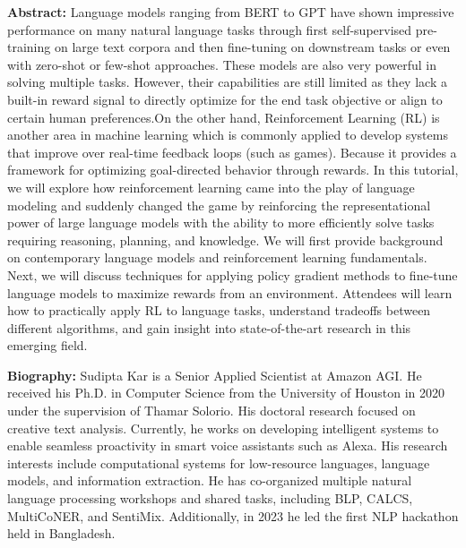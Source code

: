 {\bfseries Abstract:}
Language models ranging from BERT to GPT have shown impressive performance on many natural language tasks through first self-supervised pre-training on large text corpora and then fine-tuning on downstream tasks or even with zero-shot or few-shot approaches. These models are also very powerful in solving multiple tasks. However, their capabilities are still limited as they lack a built-in reward signal to directly optimize for the end task objective or align to certain human preferences.On the other hand, Reinforcement Learning (RL) is another area in machine learning which is commonly applied to develop systems that improve over real-time feedback loops (such as games). Because it provides a framework for optimizing goal-directed behavior through rewards. In this tutorial, we will explore how reinforcement learning came into the play of language modeling and suddenly changed the game by reinforcing the representational power of large language models with the ability to more efficiently solve tasks requiring reasoning, planning, and knowledge. We will first provide background on contemporary language models and reinforcement learning fundamentals. Next, we will discuss techniques for applying policy gradient methods to fine-tune language models to maximize rewards from an environment. Attendees will learn how to practically apply RL to language tasks, understand tradeoffs between different algorithms, and gain insight into state-of-the-art research in this emerging field.

{\bfseries Biography:}
Sudipta Kar is a Senior Applied Scientist at Amazon AGI. He received his Ph.D. in Computer Science from the University of Houston in 2020 under the supervision of Thamar Solorio. His doctoral research focused on creative text analysis. Currently, he works on developing intelligent systems to enable seamless proactivity in smart voice assistants such as Alexa. His research interests include computational systems for low-resource languages, language models, and information extraction. He has co-organized multiple natural language processing workshops and shared tasks, including BLP, CALCS, MultiCoNER, and SentiMix. Additionally, in 2023 he led the first NLP hackathon held in Bangladesh.



\newpage
